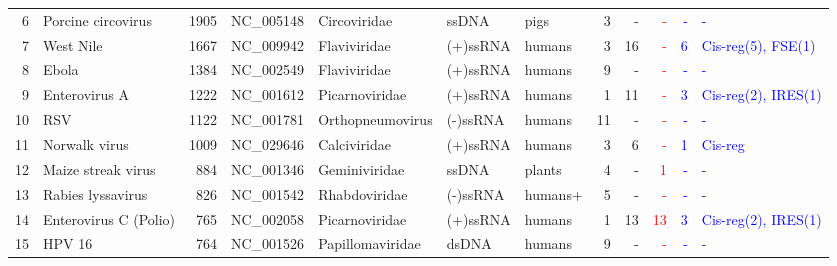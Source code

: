 \begin{center}
\begin{tabular}{|r|l|r|l|l|l|l||r|r|r||r|l||}
     6 & Porcine circovirus &        1905  & NC\_005148      & Circoviridae   & ssDNA    & pigs   &     3 &        - & \textcolor{red}{-}        & \textcolor{blue}{-}        & \textcolor{blue}{-} \\
     7 & West Nile          &        1667  & NC\_009942      & Flaviviridae   & (+)ssRNA & humans &     3 &       16 & \textcolor{red}{-}        & \textcolor{blue}{6}        & \textcolor{blue}{Cis-reg(5), FSE(1)} \\
     8 & Ebola              &        1384  & NC\_002549      & Flaviviridae   & (+)ssRNA & humans &     9 &        - & \textcolor{red}{-}        & \textcolor{blue}{-}        & \textcolor{blue}{-} \\ 
     9 & Enterovirus A      &        1222  & NC\_001612      & Picarnoviridae & (+)ssRNA & humans &     1 &       11 & \textcolor{red}{-}        & \textcolor{blue}{3}        & \textcolor{blue}{Cis-reg(2), IRES(1)} \\
    10 & RSV                &        1122  & NC\_001781      &Orthopneumovirus& (-)ssRNA & humans &    11 &        - & \textcolor{red}{-}        & \textcolor{blue}{-}        & \textcolor{blue}{-} \\
    11 & Norwalk virus      &        1009  & NC\_029646      & Calciviridae   & (+)ssRNA & humans &     3 &        6 & \textcolor{red}{-}        & \textcolor{blue}{1}        & \textcolor{blue}{Cis-reg} \\ 
    12 & Maize streak virus &         884  & NC\_001346      & Geminiviridae  & ssDNA    & plants &     4 &        - & \textcolor{red}{1}        & \textcolor{blue}{-}        & \textcolor{blue}{-}  \\
    13 & Rabies lyssavirus  &         826  & NC\_001542      & Rhabdoviridae  & (-)ssRNA & humans+&     5 &        - & \textcolor{red}{-}        & \textcolor{blue}{-}        & \textcolor{blue}{-}  \\
    14 & Enterovirus C (Polio) &      765  & NC\_002058      & Picarnoviridae & (+)ssRNA & humans &     1 &       13 & \textcolor{red}{13}       & \textcolor{blue}{3}        & \textcolor{blue}{Cis-reg(2), IRES(1)} \\
    15 & HPV 16             &         764  & NC\_001526      &Papillomaviridae& dsDNA    & humans &     9 &        - & \textcolor{red}{-}        & \textcolor{blue}{-}        & \textcolor{blue}{-} \\ \hline
\end{tabular}
\end{center}

